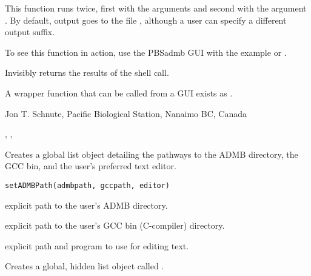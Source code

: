 \documentclass[letterpaper]{book}
\begin{document}
%
\begin{Details}\relax
This function runs  twice, first with the arguments
 and second with the argument .
By default, output goes to the file , although a user can
specify a different output suffix.

To see this function in action, use the PBSadmb GUI with the example  or
.
\end{Details}
%
\begin{Value}
Invisibly returns the results of the shell call.
\end{Value}
%
\begin{Note}\relax
A wrapper function that can be called from a GUI exists as .
\end{Note}
%
\begin{Author}\relax
 Jon T. Schnute, Pacific Biological Station, Nanaimo BC, Canada 
\end{Author}
%
\begin{SeeAlso}\relax
{}, , 
\end{SeeAlso}
%
\begin{Description}\relax
Creates a global list object detailing the pathways to the ADMB directory, the GCC bin, 
and the user's preferred text editor.
\end{Description}
%
\begin{Usage}
\begin{verbatim}
setADMBPath(admbpath, gccpath, editor)
\end{verbatim}
\end{Usage}
%
\begin{Arguments}
\begin{ldescription}
\item[\code{admbpath}] explicit path to the user's ADMB directory.
\item[\code{gccpath}] explicit path to the user's GCC bin (C-compiler) directory.
\item[\code{editor}] explicit path and program to use for editing text.
\end{ldescription}
\end{Arguments}
%
\begin{Value}
Creates a global, hidden list object called .
\end{Value}
\end{document}

